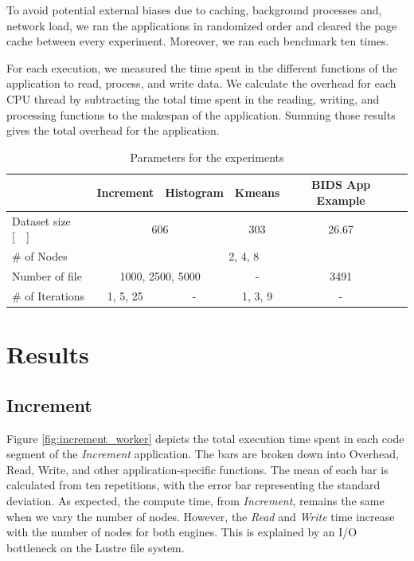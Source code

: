 \documentclass[AMA,STIX1COL]{WileyNJD-v2}
\begin{document}
To avoid potential external biases due to caching, background processes and,
network load, we ran the applications in randomized order and cleared the
page cache between every experiment.
Moreover, we ran each benchmark ten times.
				
For each execution, we measured the time spent in the different functions of the
application to read, process, and write data.
We calculate the overhead for each CPU thread by subtracting the total time
spent in the reading, writing, and processing functions to the makespan of the application.
Summing those results gives the total overhead for the application.
				
\begin{table}[t]
	\renewcommand{\arraystretch}{1.5}
	\caption{Parameters for the experiments}\label{table:parameters}
	\centering
	\begin{tabular}{|l|c|c|c|c|c|}
		\hline           & Increment & Histogram & Kmeans  & BIDS App Example \\\hline
		Dataset size [\SI{}{\gibi\byte}] &\multicolumn{2}{c|}{606} & 303 & \multicolumn{1}{c|}{26.67} \\\hline
		\# of Nodes & \multicolumn{4}{c|}{2, 4, 8} \\\hline
		Number of file & \multicolumn{2}{c|}{1000, 2500, 5000} & - & \multicolumn{1}{c|}{3491} \\\hline
		\# of Iterations & 1, 5, 25  & -         & 1, 3, 9 & -                \\\hline
	\end{tabular}
\end{table}
				
\section{Results}
\subsection{Increment}
Figure \ref{fig:increment_worker} depicts the total execution time spent in each code segment of the \textit{Increment} application.
The bars are broken down into Overhead, Read, Write, and other application-specific functions.
The mean of each bar is calculated from ten repetitions, with the error bar representing the standard deviation.
As expected, the compute time, from \textit{Increment}, remains the same when we vary the number of nodes.
However, the \textit{Read} and \textit{Write} time increase with the number of nodes for both engines.
This is explained by an I/O bottleneck on the Lustre file system.
				
\end{document}
